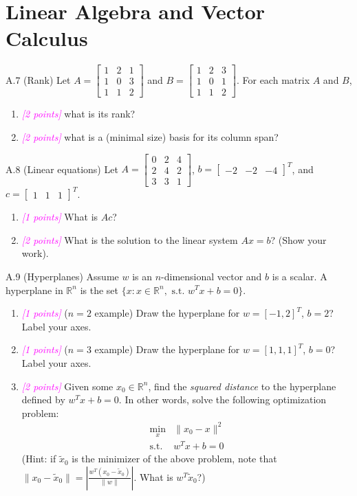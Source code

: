 \documentclass{article}
\newcommand{\field}[1]{\mathbb{#1}}
\newcommand{\1}{\mathbf{1}}
\newcommand{\R}{\field{R}} %
\newcommand{\points}[1]{\small\textcolor{magenta}{\emph{[#1 points]}} \normalsize}
\begin{document}
\section*{Linear Algebra and Vector Calculus}
A.7 (Rank) Let $A = \begin{bmatrix} 1 & 2 & 1 \\ 1 & 0 & 3 \\ 1 & 1 & 2 \end{bmatrix}$ and $B = \begin{bmatrix} 1 & 2 & 3 \\ 1 & 0 & 1 \\ 1 & 1 & 2 \end{bmatrix}$.
For each matrix $A$ and $B$,
\begin{enumerate} 
	\item \points{2} what is its rank? 
	\item \points{2} what is a (minimal size) basis for its column span?
\end{enumerate}

A.8 (Linear equations) Let $A = \begin{bmatrix} 0 & 2 & 4 \\ 2 & 4 & 2 \\ 3 & 3 & 1 \end{bmatrix}$, $b = \begin{bmatrix} -2 & -2 & -4 \end{bmatrix}^T$, and $c=\begin{bmatrix} 1 & 1 & 1 \end{bmatrix}^T$.
\begin{enumerate}
	\item \points{1} What is $Ac$?
	\item \points{2} What is the solution to the linear system $Ax = b$? (Show your work).
\end{enumerate}

A.9 (Hyperplanes) Assume $w$ is an $n$-dimensional vector and $b$ is a scalar. A hyperplane in $\R^n$ is the set $\{x : x\in \R^n,\text{ s.t. } w^T x + b = 0\}$.
\begin{enumerate}
	\item \points{1} ($n=2$ example) Draw the hyperplane for $w=[-1,2]^T$, $b=2$? Label your axes.
	\item \points{1} ($n=3$ example) Draw the hyperplane for $w=[1,1,1]^T$, $b=0$? Label your axes.
	\item \points{2} Given some $x_0 \in \R^n$, find the \emph{squared distance} to the hyperplane defined by $w^T x + b=0$.
	In other words, solve the following optimization problem:
	\begin{align*}
	\min_x& \|x_0 - x \|^2\\
	\text{s.t. }&w^Tx +b = 0
	\end{align*}
	(Hint: if $\widetilde{x}_0$ is the minimizer of the above problem, note that $\| x_0 - \widetilde{x}_0 \| = | \frac{w^T(x_0 - \widetilde{x}_0)}{\|w\|} |$. What is $w^T \widetilde{x}_0$?)
\end{enumerate} 
\end{document}
